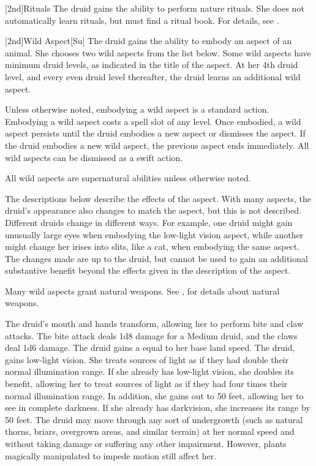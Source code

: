         [2nd]{Rituals}
        The druid gains the ability to perform nature rituals.
        She does not automatically learn rituals, but must find a ritual book.
        For details, see .

        [2nd]{Wild Aspect}[Su]
        The druid gains the ability to embody an aspect of an animal.
        She chooses two wild aspects from the list below.
        Some wild aspects have minimum druid levels, as indicated in the title of the aspect.
        At her 4th druid level, and every even druid level thereafter, the druid learns an additional wild aspect.

        Unless otherwise noted, embodying a wild aspect is a standard action.
        Embodying a wild aspect costs a spell slot of any level.
        Once embodied, a wild aspect persists until the druid embodies a new aspect or dismisses the aspect.
        If the druid embodies a new wild aspect, the previous aspect ends immediately.
        All wild aspects can be dismissed as a swift action.

        All wild aspects are supernatural abilities unless otherwise noted.

        The descriptions below describe the effects of the aspect.
        With many aspects, the druid's appearance also changes to match the aspect, but this is not described.
        Different druids change in different ways.
        For example, one druid might gain unusually large eyes when embodying the low-light vision aspect, while another might change her irises into slits, like a cat, when embodying the same aspect.
        The changes made are up to the druid, but cannot be used to gain an additional substantive benefit beyond the effects given in the description of the aspect.

        Many wild aspects grant natural weapons.
        See , for details about natural weapons.

        The druid's mouth and hands transform, allowing her to perform bite and claw attacks.
        The bite attack deals 1d8 damage for a Medium druid, and the claws deal 1d6 damage.
        The druid gains a  equal to her base land speed.
        The druid, gains low-light vision.
        She treats sources of light as if they had double their normal illumination range.
        If she already has low-light vision, she doubles its benefit, allowing her to treat sources of light as if they had four times their normal illumination range.
        In addition, she gains  out to 50 feet, allowing her to see in complete darkness.
        If she already has darkvision, she increases its range by 50 feet.
        The druid may move through any sort of undergrowth (such as natural thorns, briars, overgrown areas, and similar terrain) at her normal speed and without taking damage or suffering any other impairment.
        However, plants magically manipulated to impede motion still affect her.

